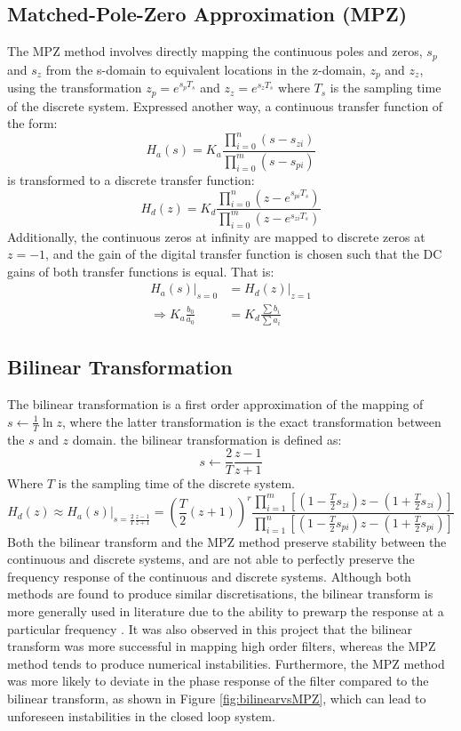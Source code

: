 \subsection{Matched-Pole-Zero Approximation (MPZ)}
The MPZ method involves directly mapping the continuous poles and zeros, $s_p$ and $s_z$ from the s-domain to equivalent locations in the z-domain, $z_p$ and $z_z$, using the transformation $z_p = e^{s_pT_s}$ and $z_z = e^{s_zT_s}$ where $T_s$ is the sampling time of the discrete system. Expressed another way, a continuous transfer function of the form:
\begin{equation}
H_a(s) = K_a\frac{\prod\limits_{i=0}^{n}(s-s_{zi})}{\prod\limits_{i=0}^{m}(s-s_{pi})}
\end{equation}
is transformed to a discrete transfer function:
\begin{equation}H_d(z) = K_d\frac{\prod\limits_{i=0}^{n}(z-e^{s_{pi}T_s})}{\prod\limits_{i=0}^{m}(z-e^{s_{zi}T_s})}\end{equation}
Additionally, the continuous zeros at infinity are mapped to discrete zeros at $z=-1$, and the gain of the digital transfer function is chosen such that the DC gains of both transfer functions is equal. That is:
\begin{align}
    H_a(s)|_{s=0} &= H_d(z)|_{z=1}\\
    \Rightarrow K_a\frac{b_0}{a_0} &= K_d\frac{\sum b_i}{\sum a_i}
\end{align}
\subsection{Bilinear Transformation}
The bilinear transformation is a first order approximation of the mapping of $s \leftarrow \frac{1}{T}\ln{z}$, where the latter transformation is the exact transformation between the $s$ and $z$ domain. the bilinear transformation is defined as:
$$s \leftarrow \frac{2}{T}\frac{z-1}{z+1}$$
Where $T$ is the sampling time of the discrete system. 
\begin{equation}
    H_d(z) \approx H_a(s)|_{s=\frac{2}{T}\frac{z-1}{z+1}} =\left(\frac{T}{2}(z+1)\right)^r\frac{\prod\limits_{i=1}^{m}[(1-\frac{T}{2}s_{zi})z - (1+\frac{T}{2}s_{zi})]}{\prod\limits_{i=1}^{n}[(1-\frac{T}{2}s_{pi})z - (1+\frac{T}{2}s_{pi})]}
\end{equation}
Both the bilinear transform and the MPZ method preserve stability between the continuous and discrete systems, and are not able to perfectly preserve the frequency response of the continuous and discrete systems. Although both methods are found to produce similar discretisations, the bilinear transform is more generally used in literature due to the ability to prewarp the response at a particular frequency \cite{jackson2013digital}. It was also observed in this project that the bilinear transform was more successful in mapping high order filters, whereas the MPZ method tends to produce numerical instabilities. Furthermore, the MPZ method was more likely to deviate in the phase response of the filter compared to the bilinear transform, as shown in Figure \ref{fig:bilinearvsMPZ}, which can lead to unforeseen instabilities in the closed loop system.

